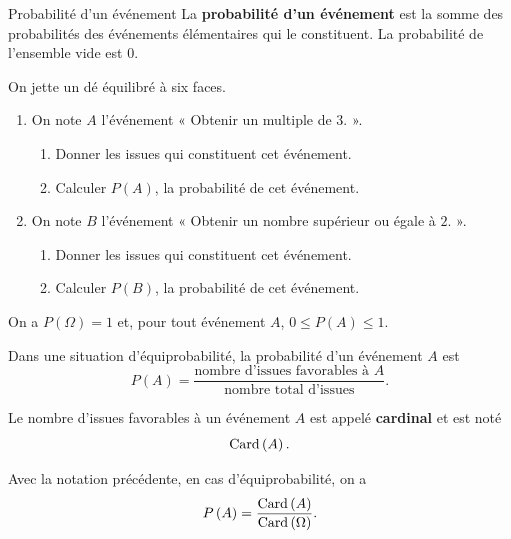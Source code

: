 \documentclass[11pt]{article}
\begin{document}
\begin{defi}{Probabilité d'un événement}
  La \textbf{probabilité d'un événement} est la somme des probabilités des
  événements élémentaires qui le constituent. La probabilité de l'ensemble vide
  est $0$.
\end{defi}

\begin{app}
  On jette un dé équilibré à six faces.
  \begin{enumerate}
    \item On note $A$ l'événement « Obtenir un multiple de $3$. ».
      \begin{enumerate}
        \item Donner les issues qui constituent cet événement.
        \item Calculer $P(A)$, la probabilité de cet événement.
      \end{enumerate}
    \item On note $B$ l'événement « Obtenir un nombre supérieur ou égale à $2$.
      ».
      \begin{enumerate}
        \item Donner les issues qui constituent cet événement.
        \item Calculer $P(B)$, la probabilité de cet événement.
      \end{enumerate}
  \end{enumerate}
\end{app}

\begin{prop}
  On a $P\left( \Omega \right) = 1$ et, pour tout événement $A$, $0\leq P\left(
  A \right)\leq 1$.
\end{prop}

\begin{prop}
  Dans une situation d'équiprobabilité, la probabilité d'un événement $A$ est
  \[
    P\left( A \right) = \frac{\text{nombre d'issues favorables à
    }A}{\text{nombre total d'issues}}.
  \]
\end{prop}

\begin{notation}
  Le nombre d'issues favorables à un événement $A$ est appelé \textbf{cardinal}
  et est noté
  \[
    \operatorname{Card}\left( A \right).
  \]
\end{notation}

\begin{rmq}
  Avec la notation précédente, en cas d'équiprobabilité, on a
  \[
    P\left( A \right) = \frac{\operatorname{Card}\left( A \right)}{\operatorname{Card}\left( \Omega
    \right)}.
  \]
\end{rmq}
\end{document}
